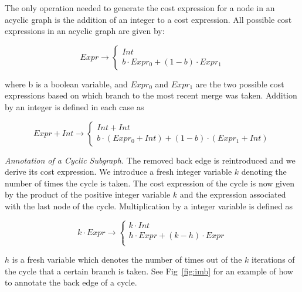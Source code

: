 \vspace*{-0.1in} 


The only operation needed to generate the cost expression for a node in an acyclic graph is the addition of an integer to a cost expression. All possible cost expressions in an acyclic graph are given by:

$$Expr \rightarrow \begin{cases} Int  \\ b \cdot Expr_{0} + (1 - b) \cdot Expr_{1} \end{cases}$$

where b is a boolean variable, and $Expr_0$ and $Expr_1$ are the two possible cost expressions based on which branch to the most recent merge was taken. Addition by an integer is defined in each case as 

 $$Expr + Int \rightarrow \begin{cases} Int + Int \\ b \cdot (Expr_0 + Int) + (1 - b) \cdot (Expr_1 + Int) \end{cases}$$
  


\textit{Annotation of a Cyclic Subgraph.} The removed back edge is reintroduced and we derive its cost expression. We introduce a fresh integer variable $k$ denoting the number of times the cycle is taken. The cost expression of the cycle is now given by the product of the positive integer variable $k$ and the expression associated with the last node of the cycle. Multiplication by a integer variable is defined as 

 $$k \cdot Expr \rightarrow \begin{cases}  k \cdot Int \\ h \cdot Expr + (k - h) \cdot Expr \\\end{cases}$$
 
$h$ is a fresh variable which denotes the number of times out of the $k$ iterations of the cycle that a certain branch is taken. See Fig~\ref{fig:imb} for an example of how to annotate the back edge of a cycle.

